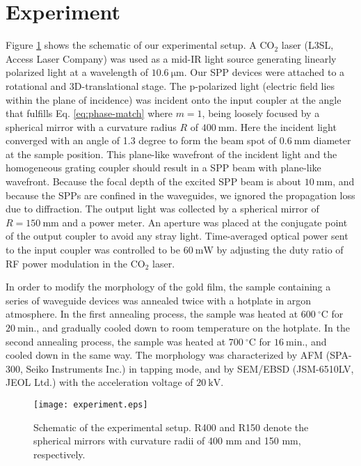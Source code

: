 \documentclass[aip,apl,reprint]{revtex4-1}
\begin{document}
\section{Experiment}
\label{sec:experiment}
Figure \ref{fig:experiment} shows the schematic of our experimental setup. 
A $\mathrm{CO_2}$ laser (L3SL, Access Laser Company) was used as a mid-IR light source generating linearly polarized light at a wavelength of $10.6\:\mathrm{\mu m}$. 
Our SPP devices were attached to a rotational and 3D-translational stage. 
The p-polarized light (electric field lies within the plane of incidence) was incident onto the input coupler at the angle that fulfills Eq. \ref{eq:phase-match} where $m=1$, being loosely focused by a spherical mirror with a curvature radius $R$ of $400\:\mathrm{mm}$.  Here the incident light converged with an angle of 1.3 degree to form the beam spot of $0.6\:\mathrm{mm}$ diameter at the sample position. This plane-like wavefront of the incident light and the homogeneous grating coupler should result in a SPP beam with plane-like wavefront. Because the focal depth of the excited SPP beam is about $10\:\mathrm{mm}$, and because the SPPs are confined in the waveguides, we ignored the propagation loss due to diffraction.
The output light was collected by a spherical mirror of $R=150\:\mathrm{mm}$ and a power meter. 
An aperture was placed at the conjugate point of the output coupler to avoid any stray light. 
Time-averaged optical power sent to the input coupler was controlled to be $60\:\mathrm{mW}$ by adjusting the duty ratio of RF power modulation in the $\mathrm{CO_2}$ laser.

In order to modify the morphology of the gold film, the sample containing a series of waveguide devices was annealed twice with a hotplate in argon atmosphere\cite{Nogues}.
In the first annealing process, the sample was heated at $600\:^\circ\mathrm{C}$ for $20\:\mathrm{min}$., and gradually cooled down to room temperature on the hotplate. In the second annealing process, the sample was heated at $700\:^\circ\mathrm{C}$ for $16\:\mathrm{min}$., and cooled down in the same way. The morphology was characterized by AFM (SPA-300, Seiko Instruments Inc.) in tapping mode, and by SEM/EBSD (JSM-6510LV, JEOL Ltd.) with the acceleration voltage of $20\:\mathrm{kV}$.

\begin{figure}
    \texttt{[image: experiment.eps]}
    \caption{Schematic of the experimental setup. R400 and R150 denote the spherical mirrors with curvature radii of 400 mm and 150 mm, respectively.}
     \label{fig:experiment}
\end{figure}
\end{document}
